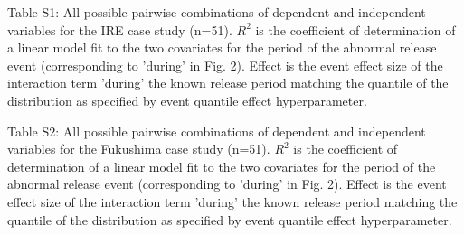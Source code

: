 \documentclass{article}
\begin{document}
\noindent Table S1: All possible pairwise combinations of dependent and independent variables for the IRE case study (n=51). $R^2$ is the coefficient of determination of a linear model fit to the two covariates for the period of the abnormal release event (corresponding to 'during' in Fig. 2). Effect is the event effect size of the interaction term 'during' the known release period matching the quantile of the distribution as specified by event quantile effect hyperparameter.



\noindent Table S2: All possible pairwise combinations of dependent and independent variables for the Fukushima case study (n=51). $R^2$ is the coefficient of determination of a linear model fit to the two covariates for the period of the abnormal release event (corresponding to 'during' in Fig. 2). Effect is the event effect size of the interaction term 'during' the known release period matching the quantile of the distribution as specified by event quantile effect hyperparameter.


\end{document}
